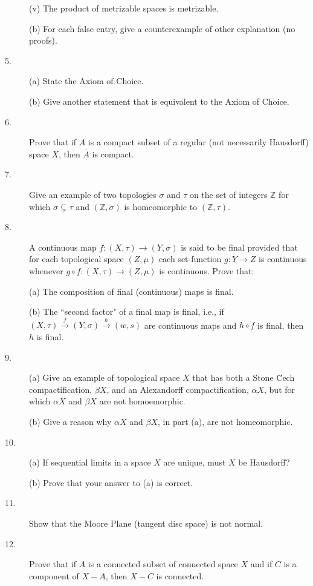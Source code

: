 \documentclass{article}
\def\Z{\mathbb Z}
\begin{document}
\begin{description}
\item[\qquad] (v)
The product of metrizable spaces is metrizable.

\item[\quad] (b)
For each false entry, give a counterexample of other explanation (no proofs).

\item[5.] (a)
State the Axiom of Choice.

\item[\quad] (b)
Give another statement that is equivalent to the Axiom of Choice.

\item[6.]
Prove that if $A$ is a compact subset of a regular (not necessarily
Hausdorff) space $X$, then $\overline A$ is compact.

\item[7.]
Give an example of two topologies $\sigma$ and $\tau$ on the set of integers
$\Z$ for which $\sigma \subsetneq \tau$ and
$(\Z, \sigma)$ is homeomorphic to $(\Z, \tau)$.

\item[8.]
A continuous map $f: (X, \tau) \to (Y, \sigma)$ is said to be final provided
that for each topological space $(Z, \mu)$ each set-function $g: Y \to Z$
is continuous whenever $g \circ f: (X, \tau) \to (Z, \mu)$
is continuous. Prove that:

\item[\quad] (a)
The composition of final (continuous) maps is final.

\item[\quad] (b)
The ``second factor" of a final map is final, i.e., if
$(X, \tau) \stackrel{f}{\longrightarrow} (Y, \sigma)
  \stackrel{h}{\longrightarrow} (w,s)$
are continuous maps and $h \circ f$ is final, then $h$ is final.

\item[9.] (a)
Give an example of topological space $X$ that has both a Stone \u Cech
compactification, $\beta X$, and an Alexandorff compactification,
$\alpha X$, but for which $\alpha X$ and $\beta X$ are not homoemorphic.

\item[\quad] (b)
Give a reason why $\alpha X$ and $\beta X$, in part (a), are not homeomorphic.

\item[10.] (a)
If sequential limits in a space $X$ are unique, must $X$ be Hausdorff?

\item[\quad] (b)
Prove that your answer to (a) is correct.

\item[11.]
Show that the Moore Plane (tangent disc space) is not normal.

\item[12.]
Prove that if $A$ is a connected subset of connected space $X$ and if
$C$ is a component of $X-A$, then $X-C$ is connected.






\end{description}    
\end{document}
